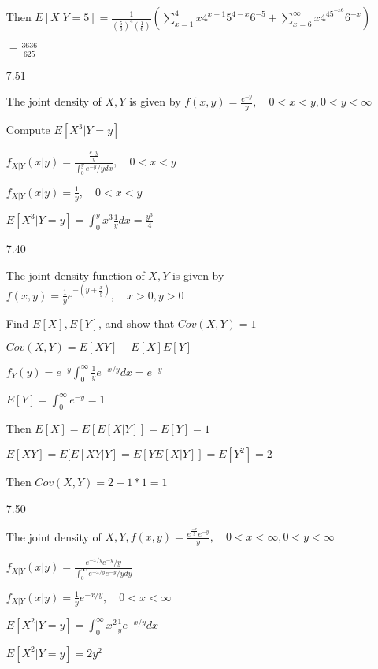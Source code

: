 \documentclass[11pt]{article}
\begin{document}
\begin{itemize}
		Then $E[X|Y = 5] = \frac{1}{(\frac{5}{6})^4(\frac{1}{6})} ( \sum_{x=1}^{4} x4^{x-1}5^{4-x}6^{-5} + \sum_{x=6}^{\infty} x4^45^{-x6}6^{-x})$

		$= \frac{3636}{625}$

	\item[7.51]

		The joint density of $X,Y$ is given by $f(x,y) = \frac{e^{-y}}{y}, \quad 0 < x < y, 0 < y < \infty$

		Compute $E[X^3 | Y=y]$

		$f_{X|Y}(x|y) = \frac{\frac{e^-y}{y}}{\int_0^y e^{-y}/y dx}, \quad 0 < x < y$

		$f_{X|Y}(x|y) = \frac{1}{y}, \quad 0 < x < y$

		$E[X^3 | Y = y] = \int_0^y x^3 \frac{1}{y} dx = \frac{y^3}{4}$



	\item[7.40]

		The joint density function of $X,Y$ is given by $f(x,y) = \frac{1}{y}e^{-(y+\frac{x}{y})}, \quad x > 0, y > 0$

		Find $E[X], E[Y]$, and show that $Cov(X,Y) = 1$

		$Cov(X,Y) = E[XY] - E[X]E[Y]$

		$f_Y(y) = e^{-y} \int_0^{\infty} \frac{1}{y} e^{-x/y} dx = e^{-y}$

		$E[Y] = \int_0^{\infty} e^{-y} = 1$

		Then $E[X] = E[E[X|Y]] = E[Y] = 1$

		$E[XY] = E[E[XY|Y] = E[Y E[X|Y]] = E[Y^2] = 2$

		Then $Cov(X,Y) = 2 - 1*1 = 1$

	\item[7.50]

		The joint density of $X,Y, f(x,y) = \frac{e^{\frac{-x}{y}} e^{-y}}{y}, \quad 0 < x < \infty, 0 < y < \infty$

		$f_{X|Y}(x|y) = \frac{e^{-x/y} e^{-y}/y}{\int_0^{\infty} e^{-x/y} e^{-y}/y dy}$

		$f_{X|Y}(x|y) = \frac{1}{y} e^{-x/y}, \quad 0< x< \infty$

		$E[X^2|Y = y] = \int_0^{\infty} x^2 \frac{1}{y} e^{-x/y} dx$

		$E[X^2 | Y=y] = 2y^2$
\end{itemize}
\end{document}
